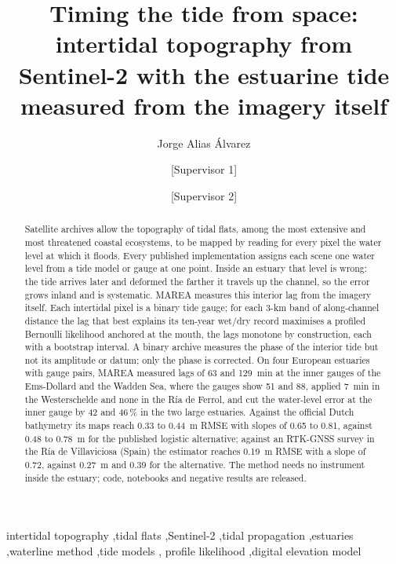 \documentclass[final,5p,times,number]{elsarticle}
\begin{document}
\begin{frontmatter}

\title{Timing the tide from space: intertidal topography from Sentinel-2
  with the estuarine tide measured from the imagery itself}

\author[a]{Jorge Alias \'Alvarez}
\author[b]{[Supervisor 1]}
\author[c]{[Supervisor 2]}

\begin{abstract}
Satellite archives allow the topography of tidal flats, among the most
extensive and most threatened coastal ecosystems, to be mapped by
reading for every pixel the water level at which it floods. Every
published implementation assigns each scene one water level from a tide
model or gauge at one point. Inside an estuary that level is wrong: the
tide arrives later and deformed the farther it travels up the channel,
so the error grows inland and is systematic. MAREA measures this
interior lag from the imagery itself. Each intertidal pixel is a binary
tide gauge; for each 3-km band of along-channel distance the lag that
best explains its ten-year wet/dry record maximises a profiled
Bernoulli likelihood anchored at the mouth, the lags monotone by
construction, each with a bootstrap interval. A binary archive measures
the phase of the interior tide but not its amplitude or datum; only the
phase is corrected. On four European estuaries with gauge pairs, MAREA
measured lags of 63 and 129~min at the inner gauges of the Ems-Dollard
and the Wadden Sea, where the gauges show 51 and 88, applied 7~min in
the Westerschelde and none in the R\'ia de Ferrol, and cut the
water-level error at the inner gauge by 42 and 46\,\% in the two large
estuaries. Against the official Dutch bathymetry its maps reach 0.33 to
0.44~m RMSE with slopes of 0.65 to 0.81, against 0.48 to 0.78~m for the
published logistic alternative; against an RTK-GNSS survey in the
R\'ia de Villaviciosa (Spain) the estimator reaches 0.19~m RMSE with a
slope of 0.72, against 0.27~m and 0.39 for the alternative. The method
needs no instrument inside the estuary; code, notebooks and negative
results are released.
\end{abstract}

\begin{keyword}
intertidal topography \sep tidal flats \sep Sentinel-2 \sep tidal
propagation \sep estuaries \sep waterline method \sep tide models \sep
profile likelihood \sep digital elevation model
\end{keyword}

\end{frontmatter}
\end{document}
